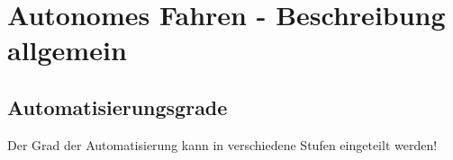 \chapter{Autonomes Fahren - Beschreibung allgemein}
\section{Automatisierungsgrade}
Der Grad der Automatisierung kann in verschiedene Stufen eingeteilt werden!

